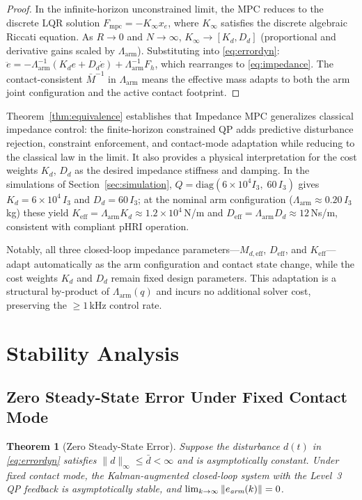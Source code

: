 \documentclass[journal]{IEEEtran}
\newtheorem{theorem}{Theorem}
\newcommand{\Mbar}{\bar{M}^{-1}}
\newcommand{\Larm}{\Lambda_{\text{arm}}}
\newcommand{\Fmpc}{F_{\text{mpc}}}
\begin{document}
\begin{proof}
In the infinite-horizon unconstrained limit, the MPC reduces to the discrete
LQR solution $\Fmpc=-K_\infty x_e$, where $K_\infty$ satisfies the discrete
algebraic Riccati equation.
As $R\to0$ and $N\to\infty$, $K_\infty\to[K_d,D_d]$ (proportional and
derivative gains scaled by $\Larm$).
Substituting into \eqref{eq:errordyn}:
$\ddot{e}=-\Larm^{-1}(K_d e+D_d\dot{e})+\Larm^{-1}F_h$,
which rearranges to \eqref{eq:impedance}.
The contact-consistent $\Mbar$ in $\Larm$ means the effective mass adapts
to both the arm joint configuration and the active contact footprint.
\end{proof}

Theorem~\ref{thm:equivalence} establishes that Impedance MPC generalizes
classical impedance control: the finite-horizon constrained QP adds
predictive disturbance rejection, constraint enforcement, and contact-mode
adaptation while reducing to the classical law in the limit.
It also provides a physical interpretation for the cost weights $K_d$,
$D_d$ as the desired impedance stiffness and damping.
In the simulations of Section~\ref{sec:simulation},
$Q=\mathrm{diag}(6\times10^4 I_3,\;60\,I_3)$ gives
$K_d=6\times10^4\,I_3$ and $D_d=60\,I_3$; at the nominal arm configuration
($\Larm\approx0.20\,I_3$\,kg) these yield
$K_{\text{eff}}=\Larm K_d\approx1.2\times10^4$\,N/m and
$D_{\text{eff}}=\Larm D_d\approx12$\,Ns/m, consistent with compliant pHRI
operation.

Notably, all three closed-loop impedance parameters---$M_{d,\text{eff}}$,
$D_{\text{eff}}$, and $K_{\text{eff}}$---adapt automatically as the arm
configuration and contact state change, while the cost weights $K_d$ and
$D_d$ remain fixed design parameters.
This adaptation is a structural by-product of $\Larm(q)$ and incurs no
additional solver cost, preserving the ${\geq}1$\,kHz control rate.

\section{Stability Analysis}\label{sec:stability}

\subsection{Zero Steady-State Error Under Fixed Contact Mode}

\begin{theorem}[Zero Steady-State Error]\label{thm:zss}
Suppose the disturbance $d(t)$ in \eqref{eq:errordyn} satisfies
$\|d\|_\infty\leq\bar{d}<\infty$ and is asymptotically constant.
Under fixed contact mode, the Kalman-augmented closed-loop system with the
Level~3 QP feedback is asymptotically stable, and
$\lim_{k\to\infty}\|e_{\emph{arm}}(k)\|=0$.
\end{theorem}
\end{document}
